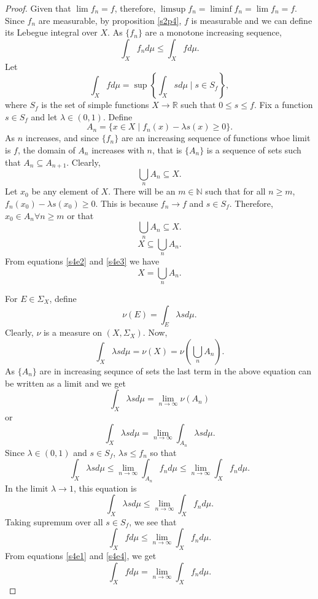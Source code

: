 \documentclass{article}
\newcommand{\sor}{\mathbb{R}}
\newcommand{\son}{\mathbb{N}}
\theoremstyle{plain}
\numberwithin{thm}{section}
\theoremstyle{plain}
\numberwithin{prop}{section}
\theoremstyle{definition}
\numberwithin{defn}{section}
\theoremstyle{remark}
\theoremstyle{plain}
\numberwithin{cor}{section}
\numberwithin{equation}{section}
\begin{document}
\begin{proof}
Given that $\lim f_n = f$, therefore, $\limsup f_n = \liminf f_n = \lim f_n = f$.
Since $f_n$ are measurable, by proposition \ref{s2p4}, $f$ is measurable and
we can define its Lebegue integral over $X$. As $\{f_n\}$ are a monotone
increasing sequence,
\begin{equation}\label{s4e1}
\int_X f_n d\mu \le \int_X fd\mu.
\end{equation}
Let 
\[
\int_X fd\mu = \sup\left\{\int_X s d\mu \;|\; s \in S_f\right\},
\]
where $S_f$ is the set of simple functions $X \rightarrow \sor$ such that
$0 \le s \le f$. Fix a function $s \in S_f$ and let $\lambda \in (0, 1)$. Define
\[
A_n = \{x \in X \;|\; f_n(x) - \lambda s(x) \ge 0\}.
\]
As $n$ increases, and since $\{f_n\}$ are an increasing sequence of functions
whoe limit is $f$, the domain of $A_n$ increases with $n$, that is $\{A_n\}$ 
is a sequence of sets such that $A_n \subseteq A_{n+1}$. Clearly,
\begin{equation}\label{s4e2}
\bigcup_n A_n \subseteq X.
\end{equation}
Let $x_0$ be any element of $X$. There will be an $m \in \son$ such that for
all $n \ge m$, $f_n(x_0) - \lambda s(x_0) \ge 0$. This is because $f_n \rightarrow
f$ and $s \in S_f$. Therefore, $x_0 \in A_n \forall n \ge m$ or that
\[
\bigcup_n A_n \subseteq X.
\]
\begin{equation}\label{s4e3}
X \subseteq \bigcup_n A_n.
\end{equation}
From equations \eqref{s4e2} and \eqref{s4e3} we have
\[
X = \bigcup_n A_n.
\]

For $E \in \Sigma_X$, define
\[
\nu(E) = \int_E \lambda s d\mu.
\]
Clearly, $\nu$ is a measure on $(X, \Sigma_X)$. Now,
\[
\int_X \lambda s d\mu = \nu(X) = \nu\left(\bigcup_n A_n\right).
\]
As $\{A_n\}$ are in increasing sequnce of sets the last term in the above equation
can be written as a limit and we get
\[
\int_X \lambda s d\mu = \lim_{n \rightarrow \infty}\nu(A_n)
\]
or
\[
\int_X \lambda s d\mu = \lim_{n \rightarrow \infty}\int_{A_n}\lambda s d\mu.
\]
Since $\lambda \in (0, 1)$ and $s \in S_f$, $\lambda s \le f_n$ so that
\[
\int_X \lambda s d\mu \le \lim_{n \rightarrow \infty}\int_{A_n}f_n d\mu
\le \lim_{n \rightarrow \infty}\int_X f_n d\mu.
\]
In the limit $\lambda \rightarrow 1$, this equation is
\[
\int_X \lambda s d\mu \le \lim_{n \rightarrow \infty}\int_X f_n d\mu.
\]
Taking supremum over all $s \in S_f$, we see that
\begin{equation}\label{s4e4}
\int_X f d\mu \le \lim_{n \rightarrow \infty}\int_X f_n d\mu.
\end{equation}
From equations \eqref{s4e1} and \eqref{s4e4}, we get
\[
\int_X f d\mu = \lim_{n \rightarrow \infty}\int_X f_n d\mu.
\]
\end{proof}
\end{document}
